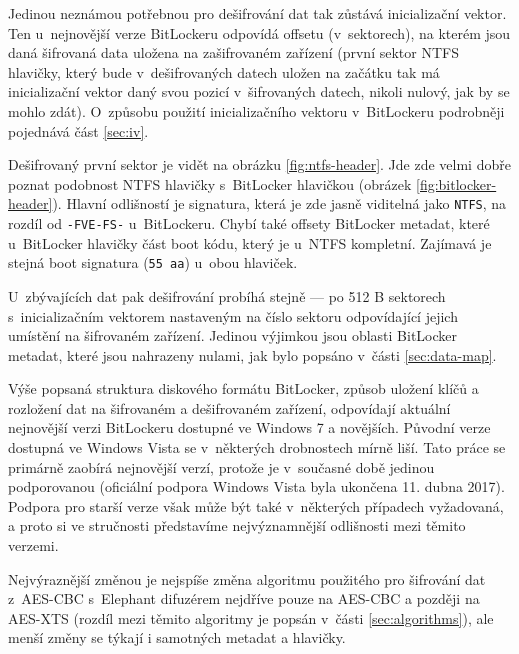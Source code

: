 Jedinou neznámou potřebnou pro dešifrování dat tak zůstává inicializační vektor. Ten u~nejnovější verze BitLockeru odpovídá offsetu (v~sektorech), na kterém jsou daná šifrovaná data uložena na zašifrovaném zařízení (první sektor NTFS hlavičky, který bude v~dešifrovaných datech uložen na začátku tak má inicializační vektor daný svou pozicí v~šifrovaných datech, nikoli nulový, jak by se mohlo zdát). O~způsobu použití inicializačního vektoru v~BitLockeru podrobněji pojednává část \ref{sec:iv}.

Dešifrovaný první sektor je vidět na obrázku \ref{fig:ntfs-header}. Jde zde velmi dobře poznat podobnost NTFS hlavičky s~BitLocker hlavičkou (obrázek \ref{fig:bitlocker-header}). Hlavní odlišností je signatura, která je zde jasně viditelná jako \texttt{NTFS}, na rozdíl od \texttt{-FVE-FS-} u~BitLockeru. Chybí také offsety BitLocker metadat, které u~BitLocker hlavičky  část boot kódu, který je u~NTFS kompletní. Zajímavá je stejná boot signatura (\texttt{55 aa}) u~obou hlaviček.

U~zbývajících dat pak dešifrování probíhá stejně --- po 512 B sektorech s~inicializačním vektorem nastaveným na číslo sektoru odpovídající jejich umístění na šifrovaném zařízení. Jedinou výjimkou jsou oblasti BitLocker metadat, které jsou nahrazeny nulami, jak bylo popsáno v~části \ref{sec:data-map}.

\label{sec:old-versions}

Výše popsaná struktura diskového formátu BitLocker, způsob uložení klíčů a rozložení dat na šifrovaném a dešifrovaném zařízení, odpovídají aktuální nejnovější verzi BitLockeru dostupné ve Windows 7 a novějších. Původní verze dostupná ve Windows Vista se v~některých drobnostech mírně liší. Tato práce se primárně zaobírá nejnovější verzí, protože je v~současné době jedinou podporovanou (oficiální podpora Windows Vista byla ukončena 11. dubna 2017\cite{hfTs55csrXKY7b4F}). Podpora pro starší verze však může být také v~některých případech vyžadovaná, a proto si ve stručnosti představíme nejvýznamnější odlišnosti mezi těmito verzemi.

Nejvýraznější změnou je nejspíše změna algoritmu použitého pro šifrování dat z~AES-CBC s~Elephant difuzérem nejdříve pouze na AES-CBC\cite{Rosendorf2013} a později na AES-XTS\cite{Sosnowski2016} (rozdíl mezi těmito algoritmy je popsán v~části \ref{sec:algorithms}), ale menší změny se týkají i samotných metadat a hlavičky.


